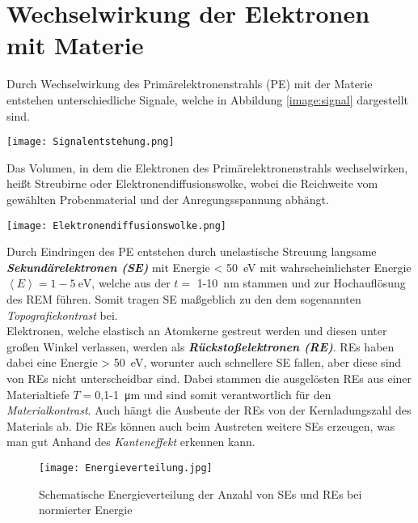 \section{Wechselwirkung der Elektronen mit Materie}
\label{sec:elektrons}
Durch Wechselwirkung des Primärelektronenstrahls (PE) mit der Materie entstehen unterschiedliche Signale, welche in Abbildung \ref{image:signal} dargestellt sind.
\begin{center}
    \texttt{[image: Signalentstehung.png]}
    \label{image:signal}
\end{center}
Das Volumen, in dem die Elektronen des Primärelektronenstrahls wechselwirken, heißt Streubirne oder Elektronendiffusionswolke, wobei die Reichweite vom gewählten Probenmaterial und der Anregungsspannung abhängt. 
\begin{center}
    \texttt{[image: Elektronendiffusionswolke.png]}
    \label{image:wolke}
\end{center}
Durch Eindringen des PE entstehen durch unelastische Streuung langsame \textbf{\textit{Sekundärelektronen (SE)}} mit Energie < \SI{50}{\electronvolt} mit wahrscheinlichster Energie $\left\langle E\right\rangle=1-\SI{5}{\electronvolt}$, welche aus der $t =$ 1-\SI{10}{\nano\metre} stammen und zur Hochauflösung des REM führen. \citep{RasterEM} Somit tragen SE maßgeblich zu den dem sogenannten \textit{Topografiekontrast} bei. \citep{WikipolyREM}\\

Elektronen, welche elastisch an Atomkerne gestreut werden und diesen unter großen Winkel verlassen, werden als \textbf{\textit{Rückstoßelektronen (RE)}}. REs haben dabei eine Energie > \SI{50}{\electronvolt}, worunter auch schnellere SE fallen, aber diese sind von REs nicht unterscheidbar sind. Dabei stammen die ausgelösten REs aus einer Materialtiefe $T=$0,1-\SI{1}{\micro\metre} und sind somit verantwortlich für den \textit{Materialkontrast}. Auch hängt die Ausbeute der REs von der Kernladungszahl des Materials ab. \citep{RasterEM} \citep{WikipolyREM} Die REs können auch beim Austreten weitere SEs erzeugen, was man gut Anhand des \textit{Kanteneffekt} erkennen kann. \citep{RasterEM}

\begin{SCfigure}[][h]
    \texttt{[image: Energieverteilung.jpg]}
    \caption{Schematische Energieverteilung der Anzahl von SEs und REs bei normierter Energie}
    \label{image:energieverteilung}
\end{SCfigure}

